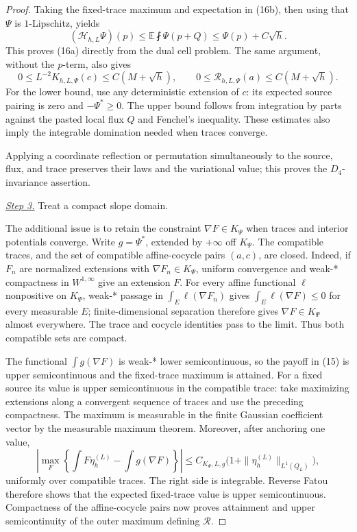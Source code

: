 \documentclass{aomart}
\theoremstyle{definition}
\newcommand{\1}{\mathbf 1}
\begin{document}
\begin{proof}
Taking the fixed-trace maximum and expectation in (16b), then using that
$\Psi$ is $1$-Lipschitz, yields
\begin{equation}
(\mathcal H_ {h,L}\Psi)(p)
\leq\mathbb E\fint\Psi(p+Q)\leq\Psi(p)+C\sqrt h.
\tag{16c}
\end{equation}
This proves (16a) directly from the dual cell problem.
The same argument, without the $p$-term, also gives
\begin{equation}
0\leq L^{-2}K_ {h,L,\Psi}(c)\leq C(M+\sqrt h),
\qquad 0\leq \mathcal R_ {h,L,\Psi}(a)\leq C(M+\sqrt h).
\tag{16d}
\end{equation}
For the lower bound, use any deterministic extension of $c$: its
expected source pairing is zero and $-\Psi^*\geq0$.  The upper bound
follows from integration by parts against the pasted local flux $Q$
and Fenchel's inequality.  These estimates also imply the integrable
domination needed when traces converge.

Applying a coordinate reflection or permutation simultaneously to the
source, flux, and trace preserves their laws and the variational value;
this proves the $D_ 4$-invariance assertion.

\smallskip\noindent
\underline{\textit{Step 3.}} Treat a compact slope domain.

The additional issue is to retain the constraint
$\nabla F\in K_\Psi$ when traces and interior potentials converge.
Write $g=\Psi^*$, extended by
$+\infty$ off $K_ \Psi$.  The compatible traces, and the set of
compatible affine-cocycle pairs $(a,c)$, are closed.  Indeed, if
$F_ n$ are normalized extensions with
$\nabla F_ n\in K_ \Psi$, uniform convergence and weak-* compactness in
$W^{1,\infty}$ give an extension $F$.  For every affine functional
$\ell$ nonpositive on $K_ \Psi$, weak-* passage in
$\int_ E\ell(\nabla F_ n)$ gives
$\int_ E\ell(\nabla F)\leq0$ for every measurable $E$;
finite-dimensional separation therefore gives
$\nabla F\in K_ \Psi$ almost everywhere.  The trace and cocycle
identities pass to the limit.  Thus both compatible sets are compact.

The functional $\int g(\nabla F)$ is weak-* lower semicontinuous, so
the payoff in (15) is upper semicontinuous and the fixed-trace maximum
is attained.  For a fixed source its value is upper semicontinuous in
the compatible trace: take maximizing extensions along a convergent
sequence of traces and use the preceding compactness.  The maximum is
measurable in the finite Gaussian coefficient vector by the measurable
maximum theorem.  Moreover, after anchoring one value,
\begin{equation}
\left|\max_ F\left\{\int F\eta_ h^{(L)}-\int g(\nabla F)\right\}\right|
\leq C_ {K_ \Psi,L,g}\bigl(1+\|\eta_ h^{(L)}\|_ {L^1(Q_ L)}\bigr),
\tag{16s}
\end{equation}
uniformly over compatible traces.  The right side is integrable.
Reverse Fatou therefore shows that the expected fixed-trace value is
upper semicontinuous.  Compactness of the affine-cocycle pairs now
proves attainment and upper semicontinuity of the outer maximum
defining $\mathcal R$.


\end{proof}
\end{document}
